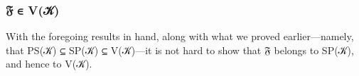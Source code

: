 \subsubsection{𝔉 ∈ V(𝒦)}\label{sssec:F-in-V}
With the foregoing results in hand, along with what we proved earlier---namely, that \ad P\ad S(\ab 𝒦) \af ⊆ \ad S\ad P(\ab 𝒦) \af ⊆ \ad V(\ab 𝒦)---it is not hard to show that \af 𝔉 belongs to \ad S\ad P(\ab 𝒦), and hence to \ad V(\ab 𝒦).
\ccpad
\begin{code}%
\>[1]\AgdaSpace{}%
\AgdaSpace{}%
\AgdaSymbol{\{}\AgdaSpace{}%
\AgdaSymbol{=}\AgdaSpace{}%
\AgdaSymbol{\}\{}\AgdaSpace{}%
\AgdaSymbol{=}\AgdaSpace{}%
\AgdaSymbol{\}}\<%
\\
%
\\[\AgdaEmptyExtraSkip]%
%
\>[1]\AgdaSpace{}%
\AgdaSymbol{:}\AgdaSpace{}%
\AgdaSpace{}%
\AgdaSpace{}%
\AgdaSpace{}%
\AgdaSpace{}%
\AgdaSpace{}%
\AgdaSpace{}%
\AgdaSpace{}%
\AgdaSymbol{(}\AgdaSymbol{\{}\AgdaSymbol{\}\{}\AgdaSymbol{\}}\AgdaSpace{}%
\AgdaSymbol{(}\AgdaSymbol{\{}\AgdaSymbol{\}\{}\AgdaSymbol{\}}\AgdaSpace{}%
\AgdaSymbol{))}\<%
\\
%
\>[1]\AgdaSpace{}%
\AgdaSpace{}%
\AgdaSymbol{=}\AgdaSpace{}%
\AgdaSpace{}%
\AgdaSpace{}%
\AgdaSymbol{(}\AgdaSpace{}%
\AgdaSymbol{)}\<%
\\
\>[1][@{}l@{\AgdaIndent{0}}]%
\>[2]\<%
\\
\>[2][@{}l@{\AgdaIndent{0}}]%
\>[3]\AgdaSpace{}%
\AgdaSymbol{:}\AgdaSpace{}%
\AgdaSpace{}%
\AgdaSpace{}%
\AgdaSymbol{(}\AgdaSymbol{\{}\AgdaSymbol{\}\{}\AgdaSymbol{\}}\AgdaSpace{}%
\AgdaSymbol{(}\AgdaSymbol{\{}\AgdaSymbol{\}\{}\AgdaSymbol{\}}\AgdaSpace{}%
\AgdaSymbol{))}\<%
\\
%
\>[3]\AgdaSpace{}%
\AgdaSymbol{=}\AgdaSpace{}%
\AgdaSymbol{(}\AgdaSpace{}%
\AgdaSymbol{)}\<%
\\
%
\\[\AgdaEmptyExtraSkip]%
%
\>[1]\AgdaSpace{}%
\AgdaSymbol{:}\AgdaSpace{}%
\AgdaSpace{}%
\AgdaSpace{}%
\AgdaSpace{}%
\AgdaSpace{}%
\AgdaSpace{}%
\AgdaSpace{}%
\AgdaSpace{}%
\<%
\\
%
\>[1]\AgdaSpace{}%
\AgdaSpace{}%
\AgdaSymbol{=}\AgdaSpace{}%
\AgdaSpace{}%
\AgdaSymbol{(}\AgdaSpace{}%
\AgdaSymbol{)}\<%
\end{code}
